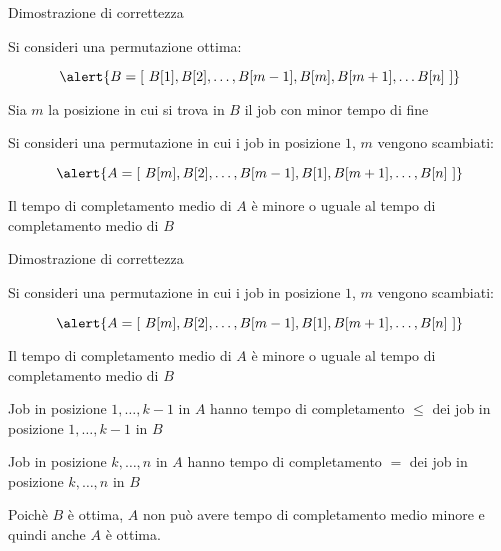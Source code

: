 \begin{frame}{Dimostrazione di correttezza}

\vspace{-9pt}
\begin{myboxtitle}
\BIL
\item Si consideri una permutazione ottima:

\[
\alert{B = [~B[1],B[2], \ldots, B[m-1], B[m], B[m+1], \ldots B[n]~]}
\]

\item Sia \alert{$m$} la posizione in cui si trova in $B$ il job con \alert{minor tempo di fine}
\item Si consideri una permutazione in cui i job in posizione $1$, $m$ vengono
scambiati: 

\[
\alert{A = [~B[m], B[2], \ldots, B[m-1], B[1], B[m+1], \ldots, B[n]~]}
\]

\item Il tempo di completamento medio di $A$ è minore o uguale al tempo
di completamento medio di $B$
\EIL
\end{myboxtitle}
\end{frame}

\begin{frame}{Dimostrazione di correttezza}

\vspace{-9pt}
\begin{myboxtitle}
\BIL
\item Si consideri una permutazione in cui i job in posizione $1$, $m$ vengono
scambiati: 

\[
\alert{A = [~B[m], B[2], \ldots, B[m-1], B[1], B[m+1], \ldots, B[n]~]}
\]

\item Il tempo di completamento medio di $A$ è minore o uguale al tempo
di completamento medio di $B$
  \BI
	\item Job in posizione $1, \ldots, k-1$ in $A$ hanno tempo di completamento 
	$\leq$ dei job in posizione $1, \ldots, k-1$ in $B$
	\item Job in posizione $k, \ldots, n$ in $A$ hanno tempo di completamento 
	$=$ dei job in posizione $k, \ldots, n$ in $B$
  \EI
\item Poichè $B$ è ottima, $A$ non può avere tempo di completamento medio minore
e quindi anche $A$ è ottima.
\EIL
\end{myboxtitle}
\end{frame}



